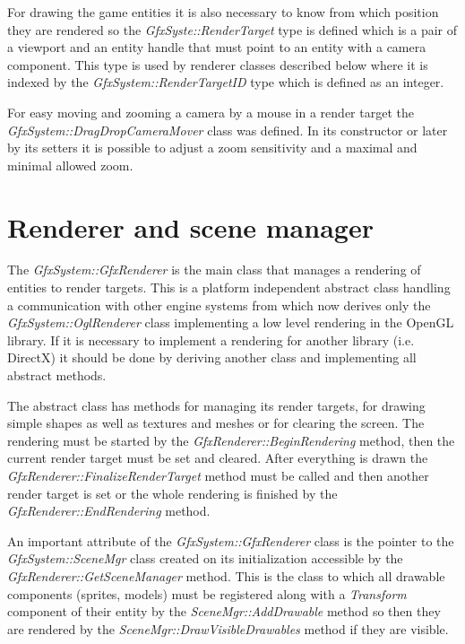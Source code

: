 \documentclass[a4paper, 12pt]{report}
\begin{document}
For drawing the game entities it is also necessary to know from which position they are rendered so the \emph{GfxSyste::RenderTarget} type is defined which is a pair of a viewport and an entity handle that must point to an entity with a camera component. This type is used by renderer classes described below where it is indexed by the \emph{GfxSystem::RenderTargetID} type which is defined as an integer.

For easy moving and zooming a camera by a mouse in a render target the \emph{GfxSystem::DragDropCameraMover} class was defined. In its constructor or later by its setters it is possible to adjust a zoom sensitivity and a maximal and minimal allowed zoom.

\section{Renderer and scene manager}

The \emph{GfxSystem::GfxRenderer} is the main class that manages a rendering of entities to render targets. This is a platform independent abstract class handling a communication with other engine systems from which now derives only the \emph{GfxSystem::OglRenderer} class implementing a low level rendering in the OpenGL library\cite{opengl}. If it is necessary to implement a rendering for another library (i.e. DirectX) it should be done by deriving another class and implementing all abstract methods.

The abstract class has methods for managing its render targets, for drawing simple shapes as well as textures and meshes or for clearing the screen. The rendering must be started by the \emph{GfxRenderer::BeginRendering} method, then the current render target must be set and cleared. After everything is drawn the \emph{GfxRenderer::FinalizeRenderTarget} method must be called and then another render target is set or the whole rendering is finished by the \emph{GfxRenderer::EndRendering} method.

An important attribute of the \emph{GfxSystem::GfxRenderer} class is the point\-er to the \emph{GfxSystem::SceneMgr} class created on its initialization accessible by the \emph{GfxRenderer::GetSceneManager} method. This is the class to which all drawable components (sprites, models) must be registered along with a \emph{Transform} component of their entity by the \emph{SceneMgr::AddDrawable} method so then they are rendered by the \emph{SceneMgr::DrawVisibleDrawables} method if they are visible.
\end{document}
